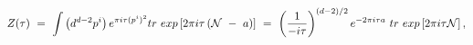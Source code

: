 \begin{equation}\label{7}  
Z(\tau) ~=~ \int \left(d^{d-2}p^i\right) e^{\pi i\tau (p^i)^2} tr ~exp \left[ 2\pi
i \tau \left( {\cal N} ~-~ a \right) \right] ~=~ \left( \frac{1}{-i\tau}
 \right)^{(d-2)/2}  e^{-2\pi i \tau a} ~tr ~exp \left[ 2\pi i\tau  
{\cal N} \right], 
\end{equation}

